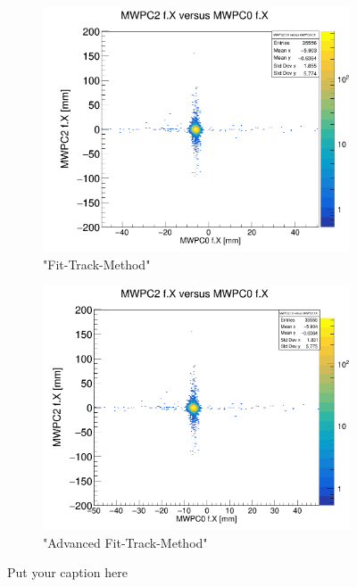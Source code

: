 \documentclass[12pt, letterpaper]{article}
\begin{document}
\begin{figure}[!htbp]
\begin{subfigure}{.5\textwidth}
\end{subfigure}
\begin{subfigure}{.5\textwidth}
  \centering
  \includegraphics[width=.9\linewidth]{plot_imgs/mw2_mw0_fit.png} 
  \caption{"Fit-Track-Method"}
  \label{fig:sub-second}
\end{subfigure}
\begin{subfigure}{.5\textwidth}
  \centering
  \includegraphics[width=.9\linewidth]{plot_imgs/mw2_mw0_last.png} 
  \caption{"Advanced Fit-Track-Method"}
  \label{fig:sub-second}
\end{subfigure}
\caption{Put your caption here}
\label{fig:fig}
\end{figure}
\FloatBarrier
\clearpage
\end{document}
